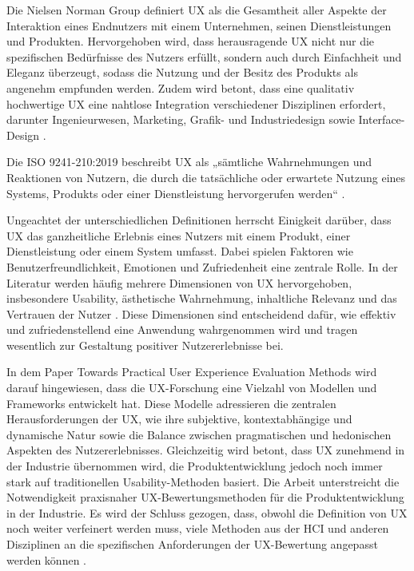 \documentclass[12pt,oneside]{article}
\begin{document}
 

Die Nielsen Norman Group definiert UX als die Gesamtheit aller Aspekte der Interaktion eines Endnutzers mit einem Unternehmen, seinen Dienstleistungen und Produkten. Hervorgehoben wird, dass herausragende UX nicht nur die spezifischen Bedürfnisse des Nutzers erfüllt, sondern auch durch Einfachheit und Eleganz überzeugt, sodass die Nutzung und der Besitz des Produkts als angenehm empfunden werden. Zudem wird betont, dass eine qualitativ hochwertige UX eine nahtlose Integration verschiedener Disziplinen erfordert, darunter Ingenieurwesen, Marketing, Grafik- und Industriedesign sowie Interface-Design \cite{nngroup}.

Die ISO 9241-210:2019 beschreibt UX als „sämtliche Wahrnehmungen und Reaktionen von Nutzern, die durch die tatsächliche oder erwartete Nutzung eines Systems, Produkts oder einer Dienstleistung hervorgerufen werden“ \cite{ISO}.

Ungeachtet der unterschiedlichen Definitionen herrscht Einigkeit darüber, dass UX das ganzheitliche Erlebnis eines Nutzers mit einem Produkt, einer Dienstleistung oder einem System umfasst. Dabei spielen Faktoren wie Benutzerfreundlichkeit, Emotionen und Zufriedenheit eine zentrale Rolle. In der Literatur werden häufig mehrere Dimensionen von UX hervorgehoben, insbesondere Usability, ästhetische Wahrnehmung, inhaltliche Relevanz und das Vertrauen der Nutzer \cite{toolbox}. Diese Dimensionen sind entscheidend dafür, wie effektiv und zufriedenstellend eine Anwendung wahrgenommen wird und tragen wesentlich zur Gestaltung positiver Nutzererlebnisse bei.

In dem Paper Towards Practical User Experience Evaluation Methods \cite{evaluationmethods} wird darauf hingewiesen, dass die UX-Forschung eine Vielzahl von Modellen und Frameworks entwickelt hat. Diese Modelle adressieren die zentralen Herausforderungen der UX, wie ihre subjektive, kontextabhängige und dynamische Natur sowie die Balance zwischen pragmatischen und hedonischen Aspekten des Nutzererlebnisses. Gleichzeitig wird betont, dass UX zunehmend in der Industrie übernommen wird, die Produktentwicklung jedoch noch immer stark auf traditionellen Usability-Methoden basiert. Die Arbeit unterstreicht die Notwendigkeit praxisnaher UX-Bewertungsmethoden für die Produktentwicklung in der Industrie. Es wird der Schluss gezogen, dass, obwohl die Definition von UX noch weiter verfeinert werden muss, viele Methoden aus der HCI und anderen Disziplinen an die spezifischen Anforderungen der UX-Bewertung angepasst werden können \cite{evaluationmethods}.
\end{document}
